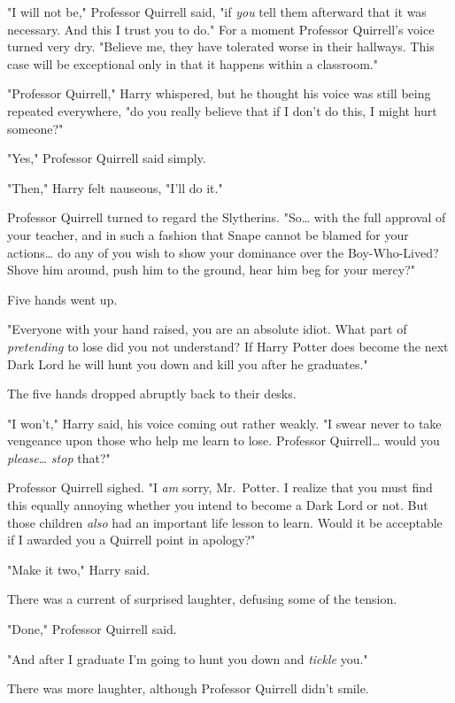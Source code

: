 "I will not be," Professor Quirrell said, "if \emph{you} tell them afterward 
that it was necessary. And this I trust you to do." For a moment Professor 
Quirrell's voice turned very dry. "Believe me, they have tolerated worse in 
their hallways. This case will be exceptional only in that it happens within a 
classroom."

"Professor Quirrell," Harry whispered, but he thought his voice was still being 
repeated everywhere, "do you really believe that if I don't do this, I might 
hurt someone?"

"Yes," Professor Quirrell said simply.

"Then," Harry felt nauseous, "I'll do it."

Professor Quirrell turned to regard the Slytherins. "So{\ldots} with the full 
approval of your teacher, and in such a fashion that Snape cannot be blamed for 
your actions{\ldots} do any of you wish to show your dominance over the 
Boy-Who-Lived? Shove him around, push him to the ground, hear him beg for your 
mercy?"

Five hands went up.

"Everyone with your hand raised, you are an absolute idiot. What part of 
\emph{pretending} to lose did you not understand? If Harry Potter does become 
the next Dark Lord he will hunt you down and kill you after he graduates."

The five hands dropped abruptly back to their desks.

"I won't," Harry said, his voice coming out rather weakly. "I swear never to 
take vengeance upon those who help me learn to lose. Professor Quirrell{\ldots} 
would you \emph{please}{\ldots} \emph{stop} that?"

Professor Quirrell sighed. "I \emph{am} sorry, Mr.~Potter. I realize that you 
must find this equally annoying whether you intend to become a Dark Lord or 
not. But those children \emph{also} had an important life lesson to learn. 
Would it be acceptable if I awarded you a Quirrell point in apology?"

"Make it two," Harry said.

There was a current of surprised laughter, defusing some of the tension.

"Done," Professor Quirrell said.

"And after I graduate I'm going to hunt you down and \emph{tickle} you."

There was more laughter, although Professor Quirrell didn't smile.

